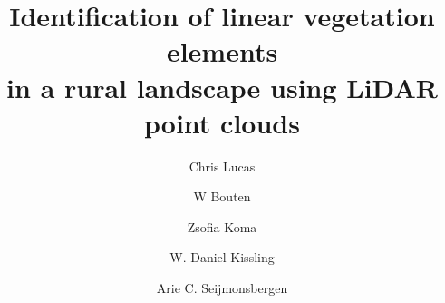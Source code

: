\title{Identification of linear vegetation elements\\in a rural landscape using LiDAR point clouds}

\author[uva,vu,gdn]{Chris Lucas}
\author[uva]{W Bouten}
\author[uva]{Zsofia Koma}
\author[uva]{W. Daniel Kissling}
\author[uva]{Arie C. Seijmonsbergen}


\address[uva]{Institute for Biodiversity and Ecosystem Dynamics (IBED), University of Amsterdam, P.O. Box 94248, 1090 GE Amsterdam, The Netherlands}
\address[vu]{Spatial Information Laboratory (SPINLab), Vrije Universiteit Amsterdam, De Boelelaan 1105, 1081 HV Amsterdam}
\address[gdn]{Geodan, President Kennedylaan 1, 1079 MB Amsterdam, The Netherlands}
